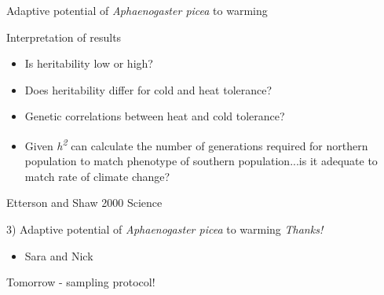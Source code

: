 \documentclass{beamer}
\begin{document}
\begin{frame}{ Adaptive potential of \textit{Aphaenogaster picea} to warming}
	\begin{block}{Interpretation of results}
		\begin{itemize}
			\item Is heritability low or high? 
			\item Does heritability differ for cold and heat tolerance?
			\item Genetic correlations between heat and cold tolerance?
			\item Given \textit{h\textsuperscript{2}} can calculate the number of generations required for northern population to match phenotype of southern population...is it adequate to match rate of climate change?
		\end{itemize}

		\tiny{Etterson and Shaw 2000 Science}
	\end{block}
\end{frame}


\begin{frame}{3) Adaptive potential of \textit{Aphaenogaster picea} to warming}
	\textit{Thanks!}
	\begin{itemize}
		\item Sara and Nick
	\end{itemize}

	Tomorrow - sampling protocol!

\end{frame}
\end{document}
